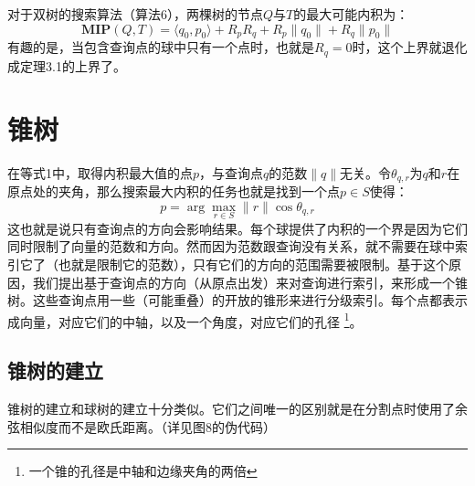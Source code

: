 \documentclass[twocolumn]{article}
\begin{document}
对于双树的搜索算法（算法6），两棵树的节点$Q$与$T$的最大可能内积为：
\begin{equation*}
\mathbf{MIP}(Q,T)=\langle q_0,p_0 \rangle + R_p R_q + R_p\|q_0\| + R_q\|p_0\|
\end{equation*}
有趣的是，当包含查询点的球中只有一个点时，也就是$R_q = 0$时，这个上界就退化成定理3.1的上界了。

\section{锥树}
在等式1中，取得内积最大值的点$p$，与查询点$q$的范数$\|q\|$无关。令$\theta_{q,r}$为$q$和$r$在原点处的夹角，那么搜索最大内积的任务也就是找到一个点$p \in S$使得：
\begin{equation}
p = \arg \max_{r \in S}\|r\|\cos\theta_{q,r}
\end{equation}
这也就是说只有查询点的方向会影响结果。每个球提供了内积的一个界是因为它们同时限制了向量的范数和方向。然而因为范数跟查询没有关系，就不需要在球中索引它了（也就是限制它的范数），只有它们的方向的范围需要被限制。基于这个原因，我们提出基于查询点的方向（从原点出发）来对查询进行索引，来形成一个锥树。这些查询点用一些（可能重叠）的开放的锥形来进行分级索引。每个点都表示成向量，对应它们的中轴，以及一个角度，对应它们的孔径
\footnote{一个锥的孔径是中轴和边缘夹角的两倍}。
\subsection{锥树的建立}
锥树的建立和球树的建立十分类似。它们之间唯一的区别就是在分割点时使用了余弦相似度而不是欧氏距离。（详见图8的伪代码）
\end{document}
